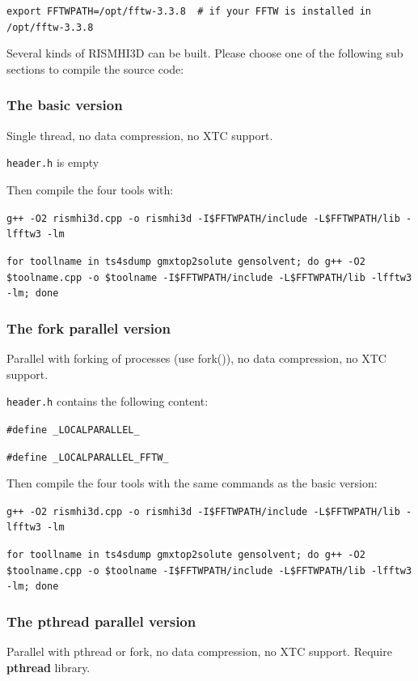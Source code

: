 \documentclass[aip,amsmath,amssymb,reprint,onecolumn]{revtex4-1}
\begin{document}
\texttt{\small\color{blue}export FFTWPATH=/opt/fftw-3.3.8 {\color{lightgray} \# if your FFTW is installed in /opt/fftw-3.3.8}}

Several kinds of RISMHI3D can be built. Please choose one of the following sub sections to compile the source code:

\subsubsection{The basic version}

Single thread, no data compression, no XTC support.

\texttt{header.h} is empty

Then compile the four tools with:

\texttt{\small\color{blue}g++ -O2 rismhi3d.cpp -o rismhi3d -I\$FFTWPATH/include -L\$FFTWPATH/lib -lfftw3 -lm}

\texttt{\small\color{blue}for toollname in ts4sdump gmxtop2solute gensolvent; do g++ -O2 \$toolname.cpp -o \$toolname -I\$FFTWPATH/include -L\$FFTWPATH/lib -lfftw3 -lm; done}

\subsubsection{The fork parallel version}

Parallel with forking of processes (use fork()), no data compression, no XTC support.

\texttt{header.h} contains the following content:

\texttt{\small\color{navyblue}\#define \_LOCALPARALLEL\_}

\texttt{\small\color{navyblue}\#define \_LOCALPARALLEL\_FFTW\_}

Then compile the four tools with the same commands as the basic version:

\texttt{\small\color{blue}g++ -O2 rismhi3d.cpp -o rismhi3d -I\$FFTWPATH/include -L\$FFTWPATH/lib -lfftw3 -lm}

\texttt{\small\color{blue}for toollname in ts4sdump gmxtop2solute gensolvent; do g++ -O2 \$toolname.cpp -o \$toolname -I\$FFTWPATH/include -L\$FFTWPATH/lib -lfftw3 -lm; done}

\subsubsection{The pthread parallel version}

Parallel with pthread or fork, no data compression, no XTC support. Require {\bf pthread} library.
\end{document}
